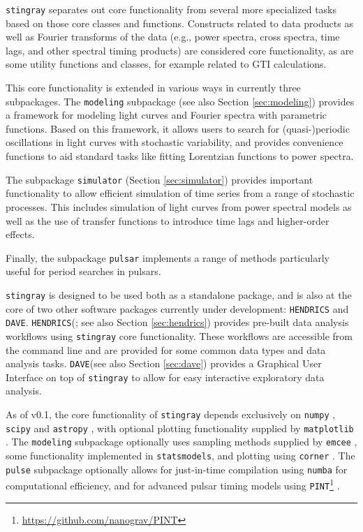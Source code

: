 \documentclass[twocolumn]{aastex62}
\newcommand{\stingray}{\texttt{stingray}\xspace}
\newcommand{\hendrics}{\texttt{HENDRICS}\xspace}
\newcommand{\dave}{\texttt{DAVE}\xspace}
\begin{document}
\stingray separates out core functionality from several more specialized tasks based on those core classes and functions. Constructs related to data products as well as Fourier transforms of the data (e.g., power spectra, cross spectra, time lags, and other spectral timing products) are considered core functionality, as are some utility functions and classes, for example related to GTI calculations. 

This core functionality is extended in various ways in currently three subpackages. 
The \texttt{modeling} subpackage (see also Section \ref{sec:modeling}) provides a framework for modeling light curves and Fourier spectra with parametric functions. 
Based on this framework, it allows users to search for (quasi-)periodic oscillations in light curves with stochastic variability, and provides convenience functions to aid standard tasks like fitting Lorentzian functions to power spectra. 

The subpackage \texttt{simulator} (Section \ref{sec:simulator}) provides important functionality to allow efficient simulation of time series from a range of stochastic processes. This includes simulation of light curves from power spectral models as well as the use of transfer functions to introduce time lags and higher-order effects. 

Finally, the subpackage \texttt{pulsar} implements a range of methods particularly useful for period searches in pulsars.

\stingray is designed to be used both as a standalone package, and is also at the core of two other software packages currently under development: 
\hendrics and \dave. 
\hendrics (\citealt{hendrics}; see also Section \ref{sec:hendrics}) provides pre-built data analysis workflows using \stingray core functionality. 
These workflows are accessible from the command line and are provided for some common data types and data analysis tasks. 
\dave (see also Section \ref{sec:dave}) provides a Graphical User Interface on top of \stingray to allow for easy interactive exploratory data analysis.
 
As of v0.1, the core functionality of \stingray depends exclusively on \texttt{numpy} \citep{numpy}, \texttt{scipy} \citep{scipy} and \texttt{astropy} \citep{astropy}, with optional plotting functionality supplied by \texttt{matplotlib} \citep{matplotlib} . 
The \texttt{modeling} subpackage optionally uses sampling methods supplied by \texttt{emcee} \citep{emcee}, some functionality implemented in \texttt{statsmodels}, and plotting using \texttt{corner} \citep{corner}. 
The \texttt{pulse} subpackage optionally allows for just-in-time compilation using \texttt{numba} \citep{numba} for computational efficiency, and for advanced pulsar timing models using \texttt{PINT}\footnote{\url{https://github.com/nanograv/PINT}} .
\end{document}
